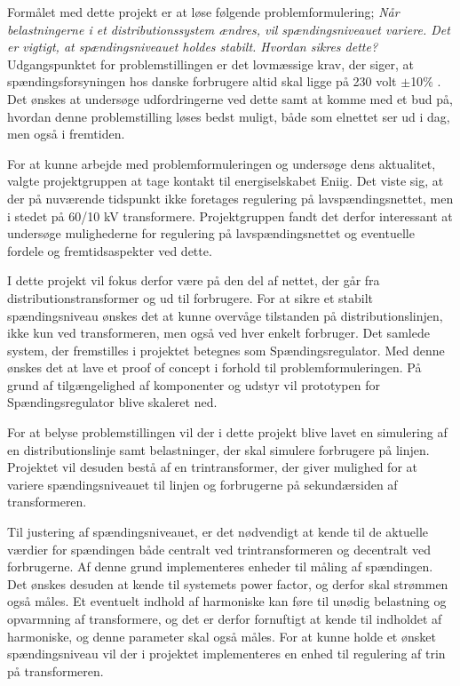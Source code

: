 
Formålet med dette projekt er at løse følgende problemformulering; \textit{Når belastningerne i et distributionssystem ændres, vil spændingsniveauet variere. Det er vigtigt, at spændingsniveauet holdes stabilt. Hvordan sikres dette?}
Udgangspunktet for problemstillingen er det lovmæssige krav, der siger, at spændingsforsyningen hos danske forbrugere altid skal ligge på 230 volt $\pm$10$\%$ \cite{Sikkerhedsstyrelsen}. Det ønskes at undersøge udfordringerne ved dette samt at komme med et bud på, hvordan denne problemstilling løses bedst muligt, både som elnettet ser ud i dag, men også i fremtiden. 

For at kunne arbejde med problemformuleringen og undersøge dens aktualitet, valgte projektgruppen at tage kontakt til energiselskabet Eniig. Det viste sig, at der på nuværende tidspunkt ikke foretages regulering på lavspændingsnettet, men i stedet på 60/10 kV transformere. Projektgruppen fandt det derfor interessant at undersøge mulighederne for regulering på lavspændingsnettet og eventuelle fordele og fremtidsaspekter ved dette.

I dette projekt vil fokus derfor være på den del af nettet, der går fra distributionstransformer og ud til forbrugere. For at sikre et stabilt spændingsniveau ønskes det at kunne overvåge tilstanden på distributionslinjen, ikke kun ved transformeren, men også ved hver enkelt forbruger. Det samlede system, der fremstilles i projektet betegnes som Spændingsregulator. Med denne ønskes det at lave et proof of concept i forhold til problemformuleringen. På grund af tilgængelighed af komponenter og udstyr vil prototypen for Spændingsregulator blive skaleret ned. 

For at belyse problemstillingen vil der i dette projekt blive lavet en simulering af en distributionslinje samt belastninger, der skal simulere forbrugere på linjen. Projektet vil desuden bestå af en trintransformer, der giver mulighed for at variere spændingsniveauet til linjen og forbrugerne på sekundærsiden af transformeren.

Til justering af spændingsniveauet, er det nødvendigt at kende til de aktuelle værdier for spændingen både centralt ved trintransformeren og decentralt ved forbrugerne. Af denne grund implementeres enheder til måling af spændingen. Det ønskes desuden at kende til systemets power factor, og derfor skal strømmen også måles. Et eventuelt indhold af harmoniske kan føre til unødig belastning og opvarmning af transformere, og det er derfor fornuftigt at kende til indholdet af harmoniske, og denne parameter skal også måles.
For at kunne holde et ønsket spændingsniveau vil der i projektet implementeres en enhed til regulering af trin på transformeren.


